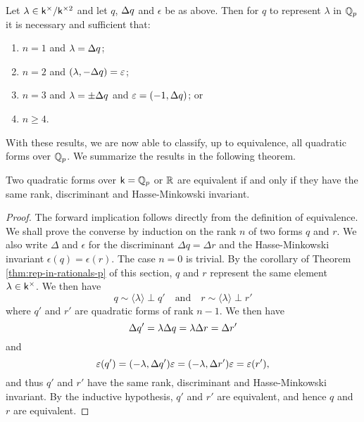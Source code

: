 \begin{corollary}
    Let \(\lambda \in \mathsf{k}^{\times}/\mathsf{k}^{\times2}\) and let \(q\), \({\Delta} q\) and \(\epsilon\) be as above. Then for \(q\) to represent \(\lambda\) in \(\mathbb{Q}_p\) it is necessary and sufficient that:

    \smallskip

    \begin{enumerate}[nosep, label=(\alph*)]
        \item \(n = 1\) and \(\lambda = {\Delta} q\);
        \item \(n = 2\) and \((\lambda, -{\Delta} q) = \varepsilon\);
        \item \(n = 3\) and \(\lambda = \pm {\Delta} q\) and \(\varepsilon = (-1, {\Delta} q)\); or
        \item \(n \geq 4\).
    \end{enumerate}
\end{corollary}

With these results, we are now able to classify, up to equivalence, all quadratic forms over \(\mathbb{Q}_p\). We summarize the results in the following theorem.

\begin{theoremx}{\normalfont\cite[p.~39]{serre2012course}}
    Two quadratic forms over \(\mathsf{k} = \mathbb{Q}_p\) or \(\mathbb{R}\) are equivalent if and only if they have the same rank, discriminant and Hasse-Minkowski invariant.
\end{theoremx}

\begin{proof}
    The forward implication follows directly from the definition of equivalence. We shall prove the converse by induction on the rank \(n\) of two  forms \(q\) and \(r\). We also write \(\Delta\) and \(\epsilon\) for the discriminant \(\Delta q = \Delta r\) and the Hasse-Minkowski invariant \(\epsilon(q) = \epsilon(r)\). The case \(n = 0\) is trivial. By the corollary of Theorem\,\ref{thm:rep-in-rationals-p} of this section, \(q\) and \(r\) represent the same element \(\lambda \in \mathsf{k}^{\times}\). We then have
    \[
        q \sim \langle \lambda \rangle \perp q' \quad \text{and} \quad r \sim \langle \lambda \rangle \perp r'
    \]
    where \(q'\) and \(r'\) are quadratic forms of rank \(n - 1\). We then have
    \[
      {\Delta} q' = \lambda {\Delta} q = \lambda {\Delta} r = {\Delta} r'
    \]
    and 
    \[
        \varepsilon(q') = (-\lambda, {\Delta} q')\varepsilon = (-\lambda, {\Delta} r')\varepsilon = \varepsilon(r'),
    \]
    and thus \(q'\) and \(r'\) have the same rank, discriminant and Hasse-Minkowski invariant. By the inductive hypothesis, \(q'\) and \(r'\) are equivalent, and hence \(q\) and \(r\) are equivalent.
\end{proof}

